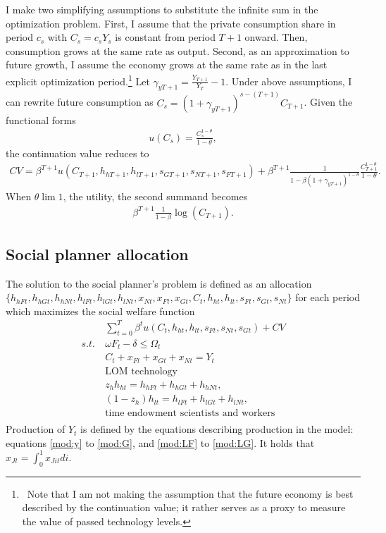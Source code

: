 I make two simplifying assumptions to substitute the infinite sum in the optimization problem. First, 
I assume that the private consumption share in period $c_s$ with $C_s=c_sY_s$ is constant from period $T+1$ onward.  Then, consumption grows at the same rate as output. 
Second, as an approximation to future growth, I assume the economy grows at the same rate as in the last explicit optimization period.\footnote{\ Note that I am not making the assumption that the future economy is best described by the continuation value; it rather serves as a proxy to measure the value of passed technology levels. } 
Let $\gamma_{yT+1}=\frac{Y_{T+1}}{Y_{T}}-1$. Under above assumptions, I can rewrite future consumption as $C_s=(1+\gamma_{yT+1})^{s-(T+1)}C_{T+1}$.
Given the functional forms
\begin{align*}
u(C_s)= \frac{C_s^{1-\theta}}{1-\theta},
\end{align*}
the continuation value reduces to
\begin{align*}
CV= \beta^{T+1} u(C_{T+1},h_{h{T+1}}, h_{l{T+1}}, s_{G{T+1}}, s_{N{T+1}}, s_{F{T+1}})+\beta^{T+1}\frac{1}{1-\beta (1+\gamma_{yT+1})^{1-\theta}}\frac{C_{T+1}^{1-\theta}}{1-\theta}.
\end{align*}
When $\theta\lim 1$, the utility, the second summand becomes
\begin{align*}\beta^{T+1}\frac{1}{1-\beta}\log(C_{T+1}).
\end{align*}
%

\subsection{Social planner allocation}\label{app:sp_prob} The solution to the social planner's problem is defined as an allocation \\ $\{h_{hFt}, h_{hGt}, h_{hNt}, h_{lFt}, h_{lGt}, h_{lNt}, x_{Nt}, x_{Ft}, x_{Gt}, C_t,  h_{ht}, h_{lt}, s_{Ft}, s_{Gt}, s_{Nt} \}$ for each period which maximizes the social welfare function 
\begin{align*} &\sum_{t=0}^{T}\beta^t u(C_{t}, h_{ht}, h_{lt}, s_{Ft}, s_{Nt}, s_{Gt})+ CV\\
s.t.\ &  \omega F_{t} -\delta \leq \Omega_t\\
&C_t+x_{Ft}+x_{Gt}+x_{Nt}=Y_t\\
&\text{LOM technology}\\
&z_h h_{ht}=h_{hFt}+h_{hGt}+h_{hNt},\\
&(1-z_h) h_{lt}=h_{lFt}+h_{lGt}+h_{lNt},\\
&\text{time endowment scientists and workers}\\
\end{align*}
Production of $Y_t$ is defined by the equations describing production in the model: equations \ref{mod:y} to \ref{mod:G}, and \ref{mod:LF} to \ref{mod:LG}. It holds that $x_{Jt}=\int_{0}^{1}x_{Jit}di$.
